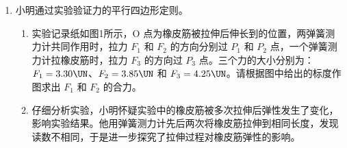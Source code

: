 \documentclass[\gkver]{gaokaozhenti}
\begin{document}
\begin{enumerate}
\begin{enumerate}
\item
用螺旋测微器测量合金丝的直径。为防止读数时测微螺杆发生转动，读数前应先旋紧图1所示的部件\_\_\_\_\_\_\_\_（选填“A”、“B”、“C”或“D”）。从图中的示数可读出合金丝的直径为\_\_\_\_\_\_\_\_$\Umm$。
\item
如图2所示是测量合金丝电阻的电路，相关器材的规格已在图中标出。合上开关，将滑动变阻器的滑片移到最左端的过程中，发现电压表和电流表的指针只在图示位置发生很小的变化。由此可以推断：电路中\_\_\_\_\_\_（选填图中表示接线柱的数字）之间出现了\_\_\_\_\_\_（选填“短路”或“断路”）。
\item
在电路故障被排除后，调节滑动变阻器，读出电压表和电流表的示数分别为 $2.23\UV$ 和 $38\UmA$，由此，该同学算出接入电路部分的合金丝的阻值为 $58.7\UO$。为了更准确地测出合金丝的阻值，在不更换实验器材的条件下，对实验应作怎样的改进？请写出两条建议。
\end{enumerate}

{figs/10b.png}



\item
小明通过实验验证力的平行四边形定则。

\begin{enumerate}
\item
实验记录纸如图1所示，O 点为橡皮筋被拉伸后伸长到的位置，两弹簧测力计共同作用时，拉力 $F_{1}$ 和 $F_{2}$ 的方向分别过 $P_{1}$ 和 $P_{2}$ 点，一个弹簧测力计拉橡皮筋时，拉力 $F_{3}$ 的方向过 $P_{3}$ 点。三个力的大小分别为：$F_{1}=3.30\UN$、$F_{2}=3.85\UN$ 和 $F_{3}=4.25\UN$。请根据图中给出的标度作图求出 $F_{1}$ 和 $F_{2}$ 的合力。
\item
仔细分析实验，小明怀疑实验中的橡皮筋被多次拉伸后弹性发生了变化，影响实验结果。他用弹簧测力计先后两次将橡皮筋拉伸到相同长度，发现读数不相同，于是进一步探究了拉伸过程对橡皮筋弹性的影响。


\end{enumerate}
\end{enumerate}
\end{document}
